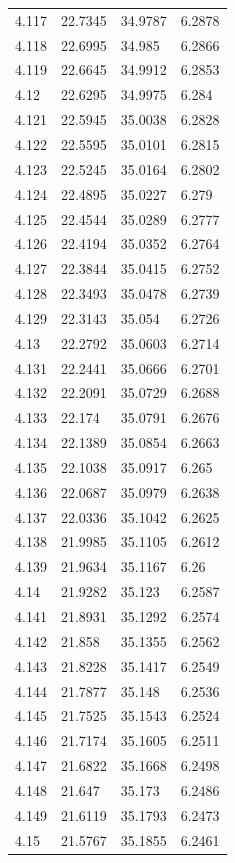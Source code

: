\begin{tabular}{llll}
4.117 & 22.7345 & 34.9787 & 6.2878 \\
4.118 & 22.6995 & 34.985 & 6.2866 \\
4.119 & 22.6645 & 34.9912 & 6.2853 \\
4.12 & 22.6295 & 34.9975 & 6.284 \\
4.121 & 22.5945 & 35.0038 & 6.2828 \\
4.122 & 22.5595 & 35.0101 & 6.2815 \\
4.123 & 22.5245 & 35.0164 & 6.2802 \\
4.124 & 22.4895 & 35.0227 & 6.279 \\
4.125 & 22.4544 & 35.0289 & 6.2777 \\
4.126 & 22.4194 & 35.0352 & 6.2764 \\
4.127 & 22.3844 & 35.0415 & 6.2752 \\
4.128 & 22.3493 & 35.0478 & 6.2739 \\
4.129 & 22.3143 & 35.054 & 6.2726 \\
4.13 & 22.2792 & 35.0603 & 6.2714 \\
4.131 & 22.2441 & 35.0666 & 6.2701 \\
4.132 & 22.2091 & 35.0729 & 6.2688 \\
4.133 & 22.174 & 35.0791 & 6.2676 \\
4.134 & 22.1389 & 35.0854 & 6.2663 \\
4.135 & 22.1038 & 35.0917 & 6.265 \\
4.136 & 22.0687 & 35.0979 & 6.2638 \\
4.137 & 22.0336 & 35.1042 & 6.2625 \\
4.138 & 21.9985 & 35.1105 & 6.2612 \\
4.139 & 21.9634 & 35.1167 & 6.26 \\
4.14 & 21.9282 & 35.123 & 6.2587 \\
4.141 & 21.8931 & 35.1292 & 6.2574 \\
4.142 & 21.858 & 35.1355 & 6.2562 \\
4.143 & 21.8228 & 35.1417 & 6.2549 \\
4.144 & 21.7877 & 35.148 & 6.2536 \\
4.145 & 21.7525 & 35.1543 & 6.2524 \\
4.146 & 21.7174 & 35.1605 & 6.2511 \\
4.147 & 21.6822 & 35.1668 & 6.2498 \\
4.148 & 21.647 & 35.173 & 6.2486 \\
4.149 & 21.6119 & 35.1793 & 6.2473 \\
4.15 & 21.5767 & 35.1855 & 6.2461 \\

\end{tabular}
